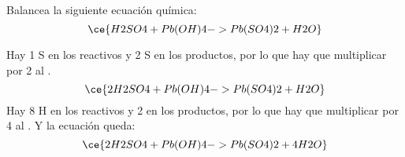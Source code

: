 Balancea la siguiente ecuación química:
\[\ce{H2SO4 + Pb(OH)4 -> Pb(SO4)2 + H2O}\]
\begin{solutionbox}{5cm}
    Hay 1 S en los reactivos y 2 S en los productos, por lo que hay que multiplicar por 2 al .
    \[ \ce{2H2SO4 + Pb(OH)4 -> Pb(SO4)2 + H2O} \]
    Hay 8 H en los reactivos y 2 en los productos, por lo que hay que multiplicar por 4 al . Y la ecuación queda:
    \[ \ce{2H2SO4 + Pb(OH)4 -> Pb(SO4)2 + 4H2O}\]
\end{solutionbox}